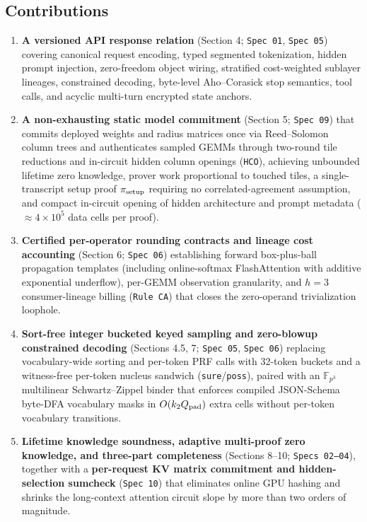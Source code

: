 \documentclass[10pt]{article}
\begin{document}
\subsection{Contributions}
\begin{enumerate}
\item{} \textbf{A versioned API response relation} (Section 4; \texttt{Spec 01}, \texttt{Spec 05}) covering canonical request encoding, typed segmented tokenization, hidden prompt injection, zero-freedom object wiring, stratified cost-weighted sublayer lineages, constrained decoding, byte-level Aho--Corasick stop semantics, tool calls, and acyclic multi-turn encrypted state anchors.
\item{} \textbf{A non-exhausting static model commitment} (Section 5; \texttt{Spec 09}) that commits deployed weights and radius matrices once via Reed--Solomon column trees and authenticates sampled GEMMs through two-round tile reductions and in-circuit hidden column openings (\texttt{HCO}), achieving unbounded lifetime zero knowledge, prover work proportional to touched tiles, a single-transcript setup proof $\pi_{\rm setup}$ requiring no correlated-agreement assumption, and compact in-circuit opening of hidden architecture and prompt metadata ($\approx 4\times 10^5$ data cells per proof).
\item{} \textbf{Certified per-operator rounding contracts and lineage cost accounting} (Section 6; \texttt{Spec 06}) establishing forward box-plus-ball propagation templates (including online-softmax FlashAttention with additive exponential underflow), per-GEMM observation granularity, and $h=3$ consumer-lineage billing (\texttt{Rule CA}) that closes the zero-operand trivialization loophole.
\item{} \textbf{Sort-free integer bucketed keyed sampling and zero-blowup constrained decoding} (Sections 4.5, 7; \texttt{Spec 05}, \texttt{Spec 06}) replacing vocabulary-wide sorting and per-token PRF calls with 32-token buckets and a witness-free per-token nucleus sandwich (\texttt{sure}/\texttt{poss}), paired with an $\mathbb F_{p^3}$ multilinear Schwartz--Zippel binder that enforces compiled JSON-Schema byte-DFA vocabulary masks in $O(k_2 Q_{\rm pad})$ extra cells without per-token vocabulary transitions.
\item{} \textbf{Lifetime knowledge soundness, adaptive multi-proof zero knowledge, and three-part completeness} (Sections 8--10; \texttt{Specs 02--04}), together with a \textbf{per-request KV matrix commitment and hidden-selection sumcheck} (\texttt{Spec 10}) that eliminates online GPU hashing and shrinks the long-context attention circuit slope by more than two orders of magnitude.

\end{enumerate}
\end{document}
